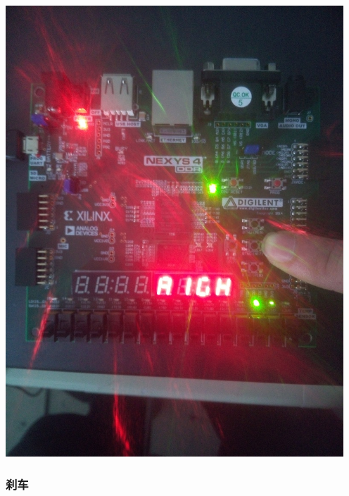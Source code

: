 \documentclass[11pt, a4paper]{article}
\begin{document}
\begin{CJK*}{UTF8}{gbsn}
\begin{appendices}
  \begin{center}
    \includegraphics[width = 5in]{right2.jpg}
  \end{center}

  \subsubsection*{刹车}


\end{appendices}
\end{CJK*}
\end{document}
